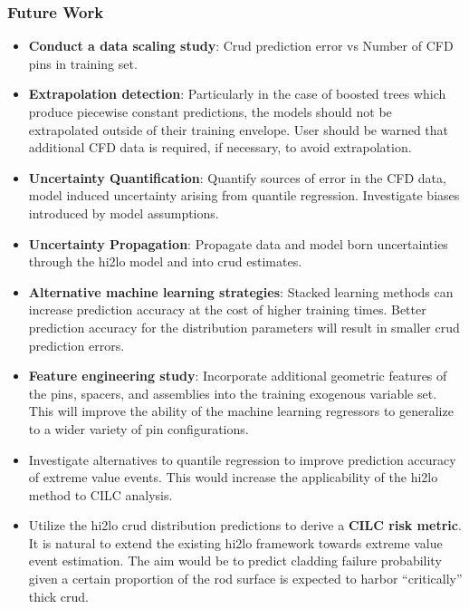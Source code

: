 \documentclass[t, pdftex]{beamer}
\begin{document}
\begin{frame}[shrink=10]
\frametitle{Future Work}
\vspace{-16pt}
\scriptsize{
\begin{itemize}
    \item \textbf{Conduct a data scaling study}:  Crud prediction error vs Number of CFD pins in training set.
    \item \textbf{Extrapolation detection}:  Particularly in the case of boosted trees which produce piecewise constant predictions, the models should not be extrapolated outside of their training envelope.  User should be warned that additional CFD data is required, if necessary, to avoid extrapolation.
    \item \textbf{Uncertainty Quantification}:  Quantify sources of error in the CFD data, model induced uncertainty arising from quantile regression.  Investigate biases introduced by model assumptions.
    \item \textbf{Uncertainty Propagation}:  Propagate data and model born uncertainties through the hi2lo model and into crud estimates.
    \item\textbf{ Alternative machine learning strategies}:  Stacked learning methods can increase prediction accuracy at the cost of higher training times.  Better prediction accuracy for the distribution parameters will result in smaller crud prediction errors.
    \item \textbf{Feature engineering study}:  Incorporate additional geometric features of the pins, spacers, and assemblies into the training exogenous variable set.  This will improve the ability of the machine learning regressors to generalize to a wider variety of pin configurations.
    \item Investigate alternatives to quantile regression to improve prediction accuracy of extreme value events.  This would increase the applicability of the hi2lo method to CILC analysis.
    \item Utilize the hi2lo crud distribution predictions to derive a \textbf{CILC risk metric}.  It is natural to extend the existing hi2lo framework towards extreme value event estimation.  The aim would be to predict cladding failure probability given a certain proportion of the rod surface is expected to harbor ``critically'' thick crud.
\end{itemize}
}
\end{frame}
\end{document}
